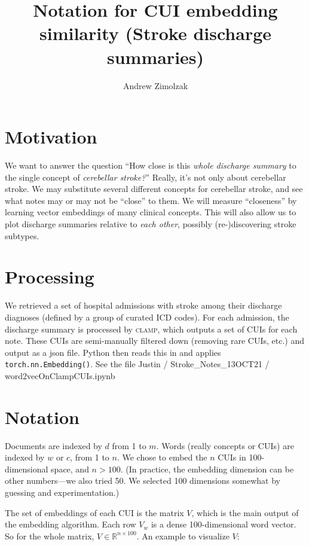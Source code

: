 \documentclass{article}
\title{Notation for CUI embedding similarity (Stroke discharge summaries)}
\author{Andrew Zimolzak}
\begin{document}
\maketitle

\section*{Motivation}

We want to answer the question ``How close is this \emph{whole
discharge summary} to the single concept of \emph{cerebellar
stroke?}'' Really, it's not only about cerebellar stroke. We may
substitute several different concepts for cerebellar stroke, and see
what notes may or may not be ``close'' to them. We will measure
``closeness'' by learning vector embeddings of many clinical concepts.
This will also allow us to plot discharge summaries relative to
\emph{each other}, possibly (re-)discovering stroke subtypes.

\section*{Processing}

We retrieved a set of hospital admissions with stroke among their
discharge diagnoses (defined by a group of curated ICD codes). For
each admission, the discharge summary is processed by \textsc{clamp},
which outputs a set of CUIs for each note. These CUIs are
semi-manually filtered down (removing rare CUIs, etc.) and output as a
json file. Python then reads this in and applies
\texttt{torch.nn.Embedding()}. See the file Justin /
Stroke\_Notes\_13OCT21 / word2vecOnClampCUIs.ipynb

\section*{Notation}

Documents are indexed by $d$ from 1 to $m$. Words (really concepts or
CUIs) are indexed by $w$ or $c$, from 1 to $n$. We chose to embed the
$n$ CUIs in 100-dimensional space, and $n > 100$. (In practice, the
embedding dimension can be other numbers---we also tried 50. We
selected 100 dimensions somewhat by guessing and experimentation.)

The set of embeddings of each CUI is the matrix $V$, which is the main
output of the embedding algorithm. Each row $V_w$ is a dense
100-dimensional word vector. So for the whole matrix, $V \in
\mathbb{R}^{n \times 100}$. An example to visualize $V$:
\end{document}
